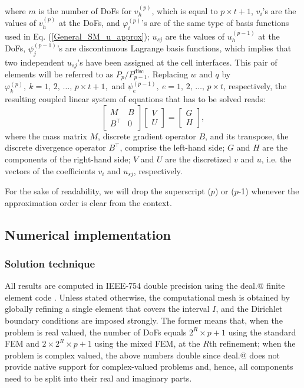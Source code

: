 \documentclass[review,3p]{elsarticle}
\makeatletter
\newcommand*{\rom}[1]{\expandafter\@slowromancap\romannumeral #1@}
\newcommand{\apostrophe}[1]{\rq{#1}}			%
\makeatother
\begin{document}
where $m$ is the number of DoFs for $v_h^{(p)}$, which is equal to $p \times t + 1$, $v_i$\apostrophe s are the values of $v_h^{(p)}$ at the DoFs, and $\varphi _{i}^{(p)}$\apostrophe s are of the same type of basis functions used in Eq. (\ref{General_SM_u_approx}); $u_{sj}$ are the values of $u_h^{(p-1)}$ at the DoFs, $\psi _{j}^{(p-1)}$\apostrophe s are discontinuous Lagrange basis functions, which implies that two independent $u_{sj}$\apostrophe s have been assigned at the cell interfaces. This pair of elements will be referred to as $P_p/P_{p-1}^{\text{disc}}$. Replacing $w$ and $q$ by $\varphi _{k}^{(p)} , ~{k} = 1, \,2, \, \ldots , \, p \times t + 1, $ and $ \psi _{e}^{(p-1)} ,~ {e} = 1, \,2, \, \ldots , \, p \times t$, respectively, the resulting coupled linear system of equations that has to be solved reads:
\begin{equation}
 \left[ \begin{array}{cc} M & B  \\ B^\top & 0 \end{array}\right] \left[ \begin{array}{cc} {V} \\ {U} \end{array}\right] =\left[ \begin{array}{cc} G \\ H \end{array}\right], \label{matrix equation mix FEM}
\end{equation}
where the mass matrix $M$, discrete gradient operator $B$, and its transpose, the discrete divergence operator $B^\top$, comprise the left-hand side; $G$ and $H$ are the components of the right-hand side; $V$ and $U$ are the discretized $v$ and $u$, i.e. the vectors of the coefficients $v_i$ and $u_{sj}$, respectively.

For the sake of readability, we will drop the superscript ($p$) or ($p$-1) whenever the approximation order is clear
from the context.

\subsection{Numerical implementation}

\subsubsection{Solution technique}

All results are computed in IEEE-754 double precision \cite{zuras2008ieee} using the deal.\rom{2} finite element code \cite{alzetta2018deal}. Unless stated otherwise, the computational mesh is obtained by globally refining a single element that covers the interval $I$, and the Dirichlet boundary conditions are imposed strongly. The former means that, when the problem is real valued, the number of DoFs equals $2^{R} \times p+1$ using the standard FEM and $2 \times 2^{R} \times p+1$ using the mixed FEM, at the $R$th refinement; when the problem is complex valued, the above numbers double since deal.\rom{2} does not provide native support for complex-valued problems and, hence, all components need to be split into their real and imaginary parts.
\end{document}
